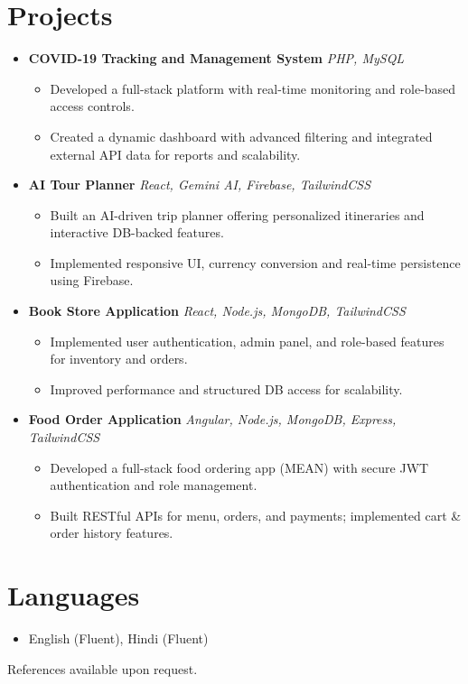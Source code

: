 \documentclass[a4paper,11pt]{article}
\begin{document}
\section*{Projects}
\begin{itemize}[leftmargin=*]
  \item \textbf{COVID-19 Tracking and Management System} \hfill \textit{PHP, MySQL}
    \begin{itemize}[leftmargin=1.5em]
      \item Developed a full-stack platform with real-time monitoring and role-based access controls.
      \item Created a dynamic dashboard with advanced filtering and integrated external API data for reports and scalability.
    \end{itemize}

  \item \textbf{AI Tour Planner} \hfill \textit{React, Gemini AI, Firebase, TailwindCSS}
    \begin{itemize}[leftmargin=1.5em]
      \item Built an AI-driven trip planner offering personalized itineraries and interactive DB-backed features.
      \item Implemented responsive UI, currency conversion and real-time persistence using Firebase.
    \end{itemize}

  \item \textbf{Book Store Application} \hfill \textit{React, Node.js, MongoDB, TailwindCSS}
    \begin{itemize}[leftmargin=1.5em]
      \item Implemented user authentication, admin panel, and role-based features for inventory and orders.
      \item Improved performance and structured DB access for scalability.
    \end{itemize}

  \item \textbf{Food Order Application} \hfill \textit{Angular, Node.js, MongoDB, Express, TailwindCSS}
    \begin{itemize}[leftmargin=1.5em]
      \item Developed a full-stack food ordering app (MEAN) with secure JWT authentication and role management.
      \item Built RESTful APIs for menu, orders, and payments; implemented cart & order history features.
    \end{itemize}
\end{itemize}

\section*{Languages}
\begin{itemize}[leftmargin=*]
  \item English (Fluent), Hindi (Fluent)
\end{itemize}

\vfill
\small{References available upon request.}
\end{document}
